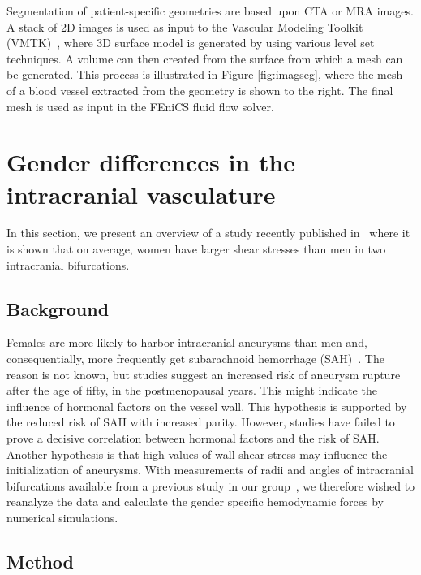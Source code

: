 Segmentation of patient-specific geometries are based upon CTA or MRA
images. A stack of 2D images is used as input to the Vascular Modeling
Toolkit (VMTK)~\cite{vmtk}, where 3D surface model is generated by using
various level set techniques. A volume can then created from the surface from
which a mesh can be generated. This process is illustrated in Figure
\ref{fig:imagseg}, where the mesh of a blood vessel extracted from the
geometry is shown to the right. The final mesh is used as input in the
FEniCS fluid flow solver.

\section{Gender differences in the intracranial vasculature} \label{gender}

In this section, we present an overview of a study recently published
in~\cite{IsaksenValen-SendstadMardalEtAl2008-sex} where it is shown that on average, women have larger
shear stresses than men in two intracranial bifurcations.

\subsection{Background}

Females are more likely to harbor intracranial aneurysms than men and,
consequentially, more frequently get subarachnoid hemorrhage
(SAH)~\cite{Humphrey2001,eden}. The reason is not known, but studies
suggest an increased risk of aneurysm rupture after the age of fifty,
in the postmenopausal years. This might indicate the influence of
hormonal factors on the vessel wall. This hypothesis is supported by
the reduced risk of SAH with increased parity. However, studies have
failed to prove a decisive correlation between hormonal factors and
the risk of SAH. Another hypothesis is that high values of wall shear
stress may influence the initialization of aneurysms. With
measurements of radii and angles of intracranial bifurcations
available from a previous study in our group~\cite{IngebrigtsenMorganFaulderEtAl2004}, we therefore
wished to reanalyze the data and calculate the gender specific
hemodynamic forces by numerical simulations.

\subsection{Method}

